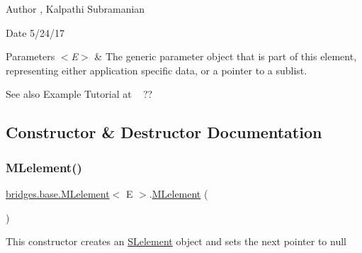 \begin{DoxyAuthor}{Author}
, Kalpathi Subramanian
\end{DoxyAuthor}
\begin{DoxyDate}{Date}
5/24/17
\end{DoxyDate}

\begin{DoxyParams}{Parameters}
{\em $<$\+E$>$} & The generic parameter object that is part of this element, representing either application specific data, or a pointer to a sublist.\\
\hline
\end{DoxyParams}
\begin{DoxySeeAlso}{See also}
Example Tutorial at ~\newline
 ?? 
\end{DoxySeeAlso}


\subsection{Constructor \& Destructor Documentation}
\mbox{\label{classbridges_1_1base_1_1_m_lelement_a721d1369c297dc3a3617a1476cb6f5f8}} 
\subsubsection{\texorpdfstring{MLelement()}{MLelement()}\hspace{0.1cm}{\footnotesize\ttfamily [1/4]}}
{\footnotesize\ttfamily \mbox{\hyperlink{classbridges_1_1base_1_1_m_lelement}{bridges.\+base.\+M\+Lelement}}$<$ E $>$.\mbox{\hyperlink{classbridges_1_1base_1_1_m_lelement}{M\+Lelement}} (\begin{DoxyParamCaption}{ }\end{DoxyParamCaption})}

This constructor creates an \mbox{\hyperlink{classbridges_1_1base_1_1_s_lelement}{S\+Lelement}} object and sets the next pointer to null \mbox{\label{classbridges_1_1base_1_1_m_lelement_ad0437d26107039d98cdba6277cff19e2}} 
